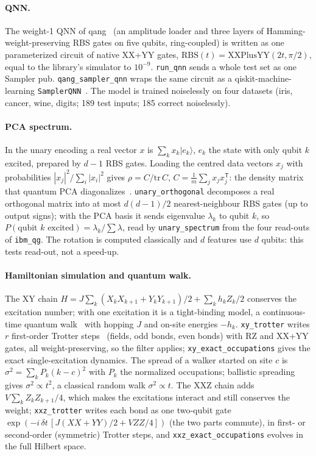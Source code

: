 \documentclass[11pt]{article}
\begin{document}
\paragraph{QNN.} The weight-1 QNN of qang~\cite{monteverde2026qml} (an amplitude loader and three layers of
Hamming-weight-preserving RBS gates on five qubits, ring-coupled) is written as one parameterized circuit
of native XX+YY gates, $\mathrm{RBS}(t)=\mathrm{XXPlusYY}(2t,\pi/2)$, equal to the library's simulator to
$10^{-9}$. \texttt{run\_qnn} sends a whole test set as one Sampler pub. \texttt{qang\_sampler\_qnn} wraps
the same circuit as a qiskit-machine-learning \texttt{SamplerQNN}~\cite{qiskitml}. The model is trained
noiselessly on four datasets (iris, cancer, wine, digits; 189 test inputs; 185 correct noiselessly).

\paragraph{PCA spectrum.} In the unary encoding a real vector $x$ is $\sum_k x_k|e_k\rangle$, $e_k$ the state
with only qubit $k$ excited, prepared by $d-1$ RBS gates. Loading the centred data vectors $x_j$ with
probabilities $|x_j|^2/\sum_i|x_i|^2$ gives $\rho=C/\mathrm{tr}\,C$, $C=\frac1m\sum_j x_jx_j^{\mathsf T}$:
the density matrix that quantum PCA diagonalizes~\cite{lloyd2014qpca}. \texttt{unary\_orthogonal}
decomposes a real orthogonal matrix into at most $d(d-1)/2$ nearest-neighbour RBS gates (up to output
signs); with the PCA basis it sends eigenvalue $\lambda_k$ to qubit $k$, so
$P(\text{qubit }k\text{ excited})=\lambda_k/\sum\lambda$, read by \texttt{unary\_spectrum} from the four
read-outs of \texttt{ibm\_qg}. The rotation is computed classically and $d$ features use $d$ qubits: this
tests read-out, not a speed-up.

\paragraph{Hamiltonian simulation and quantum walk.} The XY chain
$H=J\sum_k(X_kX_{k+1}+Y_kY_{k+1})/2+\sum_k h_kZ_k/2$ conserves the excitation number; with one excitation
it is a tight-binding model, a continuous-time quantum walk~\cite{kempe2003walks} with hopping $J$ and on-site
energies $-h_k$. \texttt{xy\_trotter} writes $r$ first-order Trotter steps~\cite{lloyd1996simulators}
(fields, odd bonds, even bonds) with RZ and XX+YY gates, all weight-preserving, so the filter applies;
\texttt{xy\_exact\_occupations} gives the exact single-excitation dynamics. The spread of a walker started
on site $c$ is $\sigma^2=\sum_kP_k(k-c)^2$ with $P_k$ the normalized occupations; ballistic spreading gives
$\sigma^2\propto t^2$, a classical random walk $\sigma^2\propto t$. The XXZ chain adds $V\sum_kZ_kZ_{k+1}/4$, which
makes the excitations interact and still conserves the weight; \texttt{xxz\_trotter} writes each bond as one
two-qubit gate $\exp(-i\,\delta t\,[J(XX+YY)/2+VZZ/4])$ (the two parts commute), in first- or second-order
(symmetric) Trotter steps, and \texttt{xxz\_exact\_occupations} evolves in the full Hilbert space.
\end{document}
